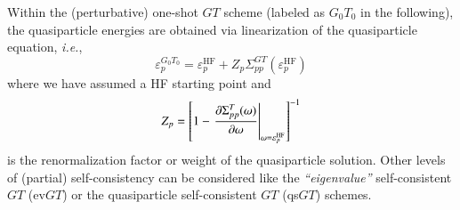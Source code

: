 \documentclass[aip,jcp,reprint,noshowkeys,superscriptaddress]{revtex4-1}
\newcommand{\ie}{\textit{i.e.}}
\newcommand{\HF}{\text{HF}}
\newcommand{\e}[2]{\eps_{#1}^{#2}}
\newcommand{\eps}{\varepsilon}
\begin{document}
Within the (perturbative) one-shot $GT$ scheme (labeled as $G_0T_0$ in the following), the quasiparticle energies are obtained via linearization of the quasiparticle equation, \cite{Strinati_1980,Hybertsen_1985a,Hybertsen_1986,Godby_1988,Linden_1988,Northrup_1991,Blase_1994,Rohlfing_1995,Shishkin_2007} \ie,
\begin{equation}
\label{eq:G0T0}
	\e{p}{G_0T_0} = \e{p}{\HF} + Z_p \Sigma^{GT}_{pp}(\e{p}{\HF})
\end{equation}
where we have assumed a HF starting point and
\begin{equation}
	Z_p = \qty[ 1 - \eval{\pdv{\Sigma^{T}_{pp}(\omega)}{\omega}}_{\omega = \e{p}{\HF}} ]^{-1}
\end{equation}
is the renormalization factor or weight of the quasiparticle solution.
Other levels of (partial) self-consistency can be considered like the \textit{``eigenvalue''} self-consistent $GT$ (ev$GT$)  \cite{Hybertsen_1986,Shishkin_2007,Blase_2011,Faber_2011,Rangel_2016,Gui_2018} or the quasiparticle self-consistent $GT$ (qs$GT$) \cite{Faleev_2004,vanSchilfgaarde_2006,Kotani_2007,Ke_2011,Kaplan_2016} schemes.

\end{document}
